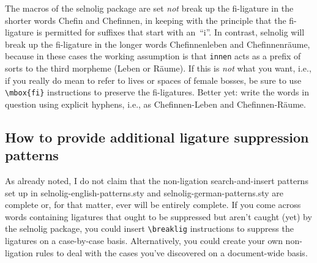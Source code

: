 \documentclass[11pt]{article}
\newcommand{\pkg}[1]{\textsf{#1}}
\newcommand{\opt}[1]{\texttt{#1}}
\newcommand{\cmmd}[1]{\texttt{\textbackslash #1}}
\begin{document}
The macros of the \pkg{selnolig} package are set \emph{not} break up the fi-ligature in the shorter words Chefin and Chefinnen, in keeping with the principle that the fi-ligature is permitted for suffixes that start with an~\enquote{i}. In contrast, \pkg{selnolig} will break up the fi-ligature in the longer words Chefinnenleben and Chefinnenräume, because in these cases the working assumption is that \opt{innen} acts as a prefix of sorts to the third morpheme (Leben or Räume). If this is \emph{not} what you want, i.e., if you really do mean to refer to lives or spaces of female bosses, be sure to use \Verb+\mbox{fi}+ instructions to preserve the fi-ligatures. Better yet: write the words in question using explicit hyphens, i.e., as Chefinnen-Leben and Chefinnen-Räume.



\subsection{How to provide additional ligature suppression patterns}

As already noted, I do not claim that the non-ligation search-and-insert patterns set up in \pkg{selnolig-english-patterns.sty} and \pkg{selnolig-german-patterns.sty} are complete or, for that matter, ever will be entirely complete. If you come across words containing ligatures that ought to be suppressed but aren't caught (yet) by the \pkg{selnolig} package, you could insert \cmmd{breaklig} instructions to suppress the ligatures on a case-by-case basis. Alternatively, you could create your own non-ligation rules to deal with the cases you've discovered on a document-wide basis.
\end{document}
